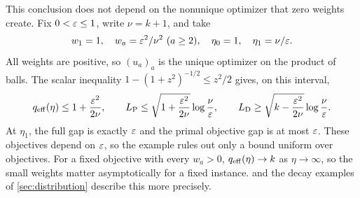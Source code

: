 This conclusion does not depend on the nonunique optimizer that zero
weights create. Fix $0<\varepsilon\leq1$, write $\nu=k+1$, and take
\begin{equation}
 w_1=1,\quad w_a=\eps^2/\nu^2\ (a\geq2),\quad
 \eta_0=1,\quad\eta_1=\nu/\eps.
 \label{eq:positive-weights-projection}
\end{equation}
All weights are positive, so $(u_a)_a$ is the unique optimizer on the
product of balls. The scalar inequality
$1-(1+z^2)^{-1/2}\leq z^2/2$ gives, on this interval,
\[
 q_{\rm eff}(\eta)\leq1+\frac{\varepsilon^2}{2\nu},\qquad
 L_{\rm P}\leq\sqrt{1+\frac{\varepsilon^2}{2\nu}}\log\frac{\nu}{\varepsilon},
 \qquad
 L_{\rm D}\geq\sqrt{k-\frac{\varepsilon^2}{2\nu}}\log\frac{\nu}{\varepsilon}.
\]
At $\eta_1$, the full gap is exactly $\varepsilon$ and the primal objective
gap is at most $\varepsilon$. These objectives depend on $\varepsilon$, so the
example rules out only a bound uniform over objectives. For a fixed
objective with every $w_a>0$, $q_{\rm eff}(\eta)\to k$ as
$\eta\to\infty$, so the small weights matter asymptotically for a
fixed instance.  and the decay examples of
\cref{sec:distribution} describe this more precisely.


